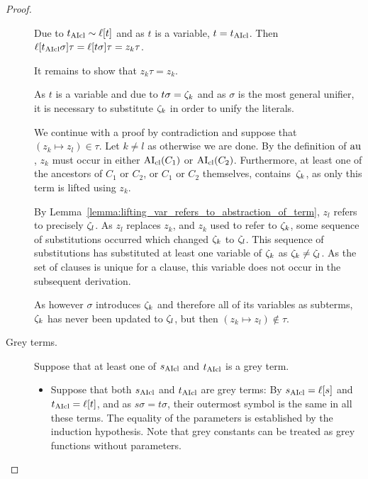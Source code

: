\documentclass[,%
	paper=a4,%
	DIV12, %
	twoside=false,%
	liststotoc,
	bibtotoc,
	draft=false,%
	numbers=noendperiod
]{scrartcl}
\begin{document}
\begin{proof}
\begin{description}
\begin{compactitem}
				Due to $t_{\operatorname{AIcl}} \sim \ell[t]$ and as $t$ is a variable, $t=t_{\operatorname{AIcl}}$.
				Then $\ell[t_{\operatorname{AIcl}}\sigma]\tau = \ell[t\sigma]\tau = z_k\tau$.

				It remains to show that $z_k\tau = z_k$.

				As $t$ is a variable and due to $t\sigma = \zeta_{k}$ and as $\sigma$ is the most general unifier, it is necessary to substitute $\zeta_{k}$ in order to unify the literals. 

				We continue with a proof by contradiction and suppose that $(z_k \mapsto z_l) \in \tau$. Let $k\neq l$ as otherwise we are done.
				By the definition of $\operatorname{au}$, $z_k$ must occur in either $\operatorname{AI}_\mathrm{cl}(C_1)$ or $\operatorname{AI}_\mathrm{cl}(C_2)$.
				Furthermore, at least one of the ancestors of $C_1$ or $C_2$, or $C_1$ or $C_2$ themselves, contains~$\zeta_{k}$, as only this term is lifted using $z_k$.

				By Lemma~\ref{lemma:lifting_var_refers_to_abstraction_of_term}, $z_l$ refers to precisely $\zeta_{l}$. %
				As $z_l$ replaces $z_k$, and $z_k$ used to refer to $\zeta_{k}$,
				some sequence of substitutions occurred which changed $\zeta_{k}$ to $\zeta_{l}$.
				This sequence of substitutions has substituted at least one variable of $\zeta_{k}$ as $\zeta_{k}\neq\zeta_{l}$.
				As the set of clauses is unique for a clause, this variable does not occur in the subsequent derivation.

				As however $\sigma$ introduces $\zeta_{k}$ and therefore all of its variables as subterms, 
				$\zeta_{k}$ has never been updated to $\zeta_{l}$, but then $(z_k \mapsto z_l) \not\in \tau$.

			\end{compactitem}

		\item[Grey terms.]
			Suppose that at least one of $s_{\operatorname{AIcl}}$ and $t_{\operatorname{AIcl}}$ is a grey term.
			\begin{itemize}
				\item
					Suppose that both $s_{\operatorname{AIcl}}$ and $t_{\operatorname{AIcl}}$ are grey terms:
					By $s_{\operatorname{AIcl}} = \ell[s]$ and 
					$t_{\operatorname{AIcl}} = \ell[t]$, and as $s\sigma = t\sigma$, their outermost symbol is the same in all these terms.
					The equality of the parameters is established by the induction hypothesis.
					Note that grey constants can be treated as grey functions without parameters.


\end{itemize}
\end{description}
\end{proof}
\end{document}
